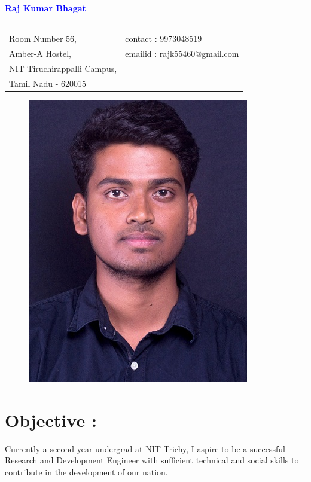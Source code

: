 \documentclass[a4paper, 12 pt]{article}
\begin{document}
 \renewcommand{\familydefault}{\sfdefault}
\centering
{\Huge\textcolor{blue}{\bf Raj Kumar Bhagat}}\\
\rule{18cm}{0.1pt}
\begin{table}[h]
\begin{tabular}{p{11 cm}p{6cm}}
Room Number 56,& contact : 9973048519\\
Amber-A Hostel,& emailid : rajk55460@gmail.com\\
NIT Tiruchirappalli Campus,\\
Tamil Nadu - 620015
\end{tabular}
\end{table}
\begin{figure}[H]
\raggedleft
\includegraphics[scale=0.3]{Rajk0520.jpg}
\end{figure}
\raggedright
\section*{Objective :}
Currently a second year undergrad at NIT Trichy, I aspire to be a successful Research and Development Engineer with sufficient technical and social skills to contribute in the development of our nation.
\end{document}
